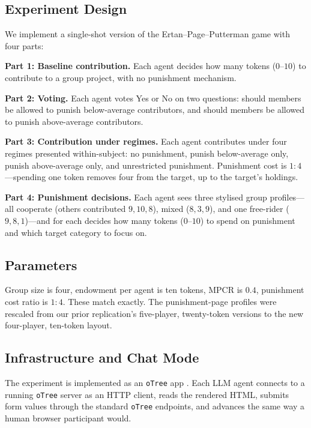\documentclass[12pt, a4paper]{article}
\begin{document}
\subsection{Experiment Design}

We implement a single-shot version of the Ertan--Page--Putterman game with four parts:

\textbf{Part 1: Baseline contribution.} Each agent decides how many tokens ($0$--$10$) to contribute to a group project, with no punishment mechanism.

\textbf{Part 2: Voting.} Each agent votes Yes or No on two questions: should members be allowed to punish below-average contributors, and should members be allowed to punish above-average contributors.

\textbf{Part 3: Contribution under regimes.} Each agent contributes under four regimes presented within-subject: no punishment, punish below-average only, punish above-average only, and unrestricted punishment. Punishment cost is $1{:}4$---spending one token removes four from the target, up to the target's holdings.

\textbf{Part 4: Punishment decisions.} Each agent sees three stylised group profiles---all cooperate (others contributed $9, 10, 8$), mixed ($8, 3, 9$), and one free-rider ($9, 8, 1$)---and for each decides how many tokens ($0$--$10$) to spend on punishment and which target category to focus on.

\subsection{Parameters}

Group size is four, endowment per agent is ten tokens, MPCR is $0.4$, punishment cost ratio is $1{:}4$. These match \citet{ertan2009who} exactly. The punishment-page profiles were rescaled from our prior replication's five-player, twenty-token versions to the new four-player, ten-token layout.

\subsection{Infrastructure and Chat Mode}

The experiment is implemented as an \texttt{oTree} app \citep{otree}. Each LLM agent connects to a running \texttt{oTree} server as an HTTP client, reads the rendered HTML, submits form values through the standard \texttt{oTree} endpoints, and advances the same way a human browser participant would.
\end{document}
